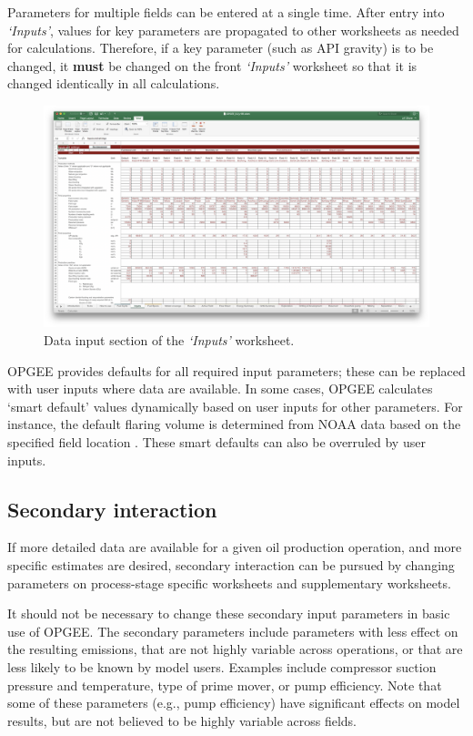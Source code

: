 \documentclass[11pt]{report}
\newcommand{\sheet}[1]{\textit{`{#1}'}}
\begin{document}
Parameters for multiple fields can be entered at a single time.
After entry into \sheet{Inputs}, values for key parameters are propagated to other worksheets as needed for calculations. Therefore, if a key parameter (such as API gravity) is to be changed, it \textbf{must} be changed on the front \sheet{Inputs} worksheet so that it is changed identically in all calculations. 



\begin{figure}[t]
\includegraphics[width=1.2\columnwidth]{images/InputSheetSS.png}
\caption{Data input section of the \sheet{Inputs} worksheet.}
\label{fig:Inputs}
\end{figure}

OPGEE provides defaults for all required input parameters; these can be replaced with user inputs where data are available. In some cases, OPGEE calculates `smart default' values dynamically based on user inputs for other parameters. For instance, the default flaring volume is determined from NOAA data based on the specified field location \cite{Elvidge2009}. These smart defaults can also be overruled by user inputs. 

\clearpage

\subsection{Secondary interaction}
If more detailed data are available for a given oil production operation, and more specific estimates are desired, secondary interaction can be pursued by changing parameters on process-stage specific worksheets and supplementary worksheets.

It should not be necessary to change these secondary input parameters in basic use of OPGEE. The secondary parameters include parameters with less effect on the resulting emissions, that are not highly variable across operations, or that are less likely to be known by model users. Examples include compressor suction pressure and temperature, type of prime mover, or pump efficiency. Note that some of these parameters (e.g., pump efficiency) have significant effects on model results, but are not believed to be highly variable across fields. 
\end{document}
